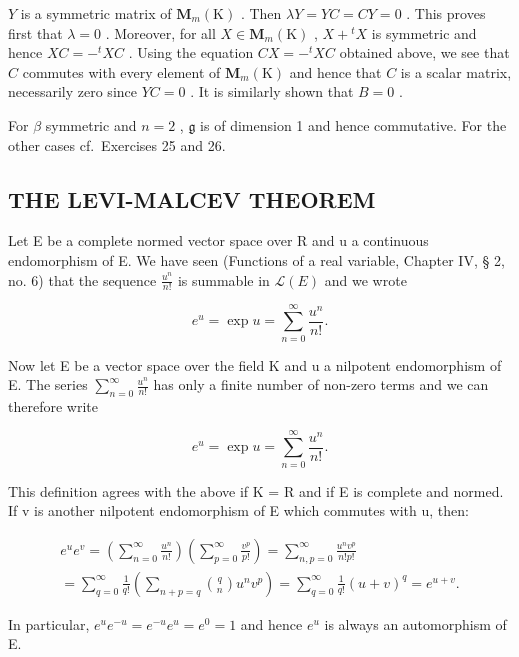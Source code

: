 \begin{enumerate}
\end{enumerate}

\(Y\) is a symmetric matrix of \(\mathbf{M}_m(\mathrm{K})\) . Then \(\lambda Y = YC = CY = 0\) . This proves first that \(\lambda = 0\) . Moreover, for all \(X \in \mathbf{M}_m(\mathrm{K})\) , \(X + {}^t X\) is symmetric and hence \(XC = -{}^t XC\) . Using the equation \(CX = -{}^t XC\) obtained above, we see that \(C\) commutes with every element of \(\mathbf{M}_m(\mathrm{K})\) and hence that \(C\) is a scalar matrix, necessarily zero since \(YC = 0\) . It is similarly shown that \(B = 0\) .

For \(\beta\) symmetric and \(n = 2\) , \(\mathfrak{g}\) is of dimension 1 and hence commutative. For the other cases cf.~Exercises 25 and 26.

\subsection{THE LEVI-MALCEV THEOREM}

Let E be a complete normed vector space over R and u a continuous endomorphism of E. We have seen (Functions of a real variable, Chapter IV, § 2, no. 6) that the sequence \(\frac{u^{n}}{n!}\) is summable in \(\mathcal{L}(E)\) and we wrote

\[
e ^ {u} = \exp u = \sum_ {n = 0} ^ {\infty} \frac {u ^ {n}}{n !}.
\]

Now let E be a vector space over the field K and u a nilpotent endomorphism of E. The series \(\sum_{n=0}^{\infty}\frac{u^{n}}{n!}\) has only a finite number of non-zero terms and we can therefore write

\[
e ^ {u} = \exp u = \sum_ {n = 0} ^ {\infty} \frac {u ^ {n}}{n !}.
\]

This definition agrees with the above if K = R and if E is complete and normed. If v is another nilpotent endomorphism of E which commutes with u, then:

\[
\begin{array}{l} e ^ {u} e ^ {v} = \left(\sum_ {n = 0} ^ {\infty} \frac {u ^ {n}}{n !}\right) \left(\sum_ {p = 0} ^ {\infty} \frac {v ^ {p}}{p !}\right) = \sum_ {n, p = 0} ^ {\infty} \frac {u ^ {n} v ^ {p}}{n ! p !} \\ = \sum_ {q = 0} ^ {\infty} \frac {1}{q !} \left(\sum_ {n + p = q} \binom {q} {n} u ^ {n} v ^ {p}\right) = \sum_ {q = 0} ^ {\infty} \frac {1}{q !} (u + v) ^ {q} = e ^ {u + v}. \end{array}\tag{3}
\]

In particular, \(e^u e^{-u} = e^{-u}e^u = e^0 = 1\) and hence \(e^u\) is always an automorphism of E.


